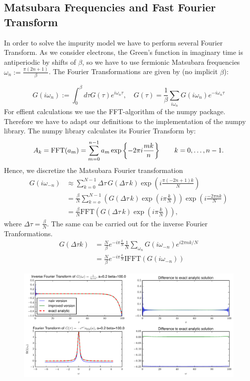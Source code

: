 \begin{appendix}
\section{Matsubara Frequencies and Fast Fourier Transform}
In order to solve the impurity model we have to perform several Fourier Transform.
As we consider electrons, the Green's function in imaginary time is antiperiodic by shifts of $\beta$, so we have to use fermionic Matsubara frequencies $ω_n:=\frac{π(2n+1)}{β}$.
The Fourier Transformations are given by (no implicit $\beta$):

\begin{equation}
  G(i ω_n) := \int_0^β dτ G(τ) e^{i ω_n τ} ,
  \quad
  G(τ) = \frac{1}{β} \sum_{i ω_n} G(i ω_n) e^{-i ω_n τ}
\end{equation}
%
For effient calculations we use the FFT-algorithm of the numpy package. Therefore we have to adapt our definitions to the implementation of the numpy library. The numpy library calculates its Fourier Transform by:
\begin{equation}
  A_k = \mathrm{FFT}(a_m) =  \sum_{m=0}^{n-1} a_m \exp\left\{-2\pi i{mk \over n}\right\}
   \qquad k = 0,\ldots,n-1.
\end{equation}
Hence, we discretize the Matsubara Fourier transformation
\begin{align}
  G(i ω_{-n}) &\approx \sum_{k=0}^{N-1} \Delta τ \, G(\Delta τ \, k) \exp{\left(i \frac{π (-2n+1)k}{N}\right)}\\
          &=\frac{\beta}{N} \sum_{k=o}^{N-1} \left( G(\Delta τ \, k)\exp{\left(i π \frac{k}{N}\right)}  \right)  \exp{\left(i \frac{-2 π n k}{N}\right)}\\
	  &= \frac{\beta}{N} \mathrm{FFT}\left( G(\Delta τ \, k)\exp{\left(i π \frac{k}{N}\right)}\right), \label{eq:MFFT}
\end{align}
where $\Delta τ = \frac{\beta}{N}$.
The same can be carried out for the inverse Fourier Tranformations.
\begin{align}
	G(\Delta τ k) &= \frac{N}{β} e^{-i π \frac{k}{N}}\frac{1}{N}\sum_{ω_n}G(i ω_{-n}) e^{i 2π n k/N}\\
	&= \frac{N}{β} e^{-i π \frac{k}{N}}\mathrm{IFFT}(G(iω_{-n})) \label{eq:IMFFT}
\end{align}
\begin{figure}[h]
	\centering
	\includegraphics[width=\textwidth]{Matsubara_Fourier_fig}

\end{figure}
\end{appendix}
